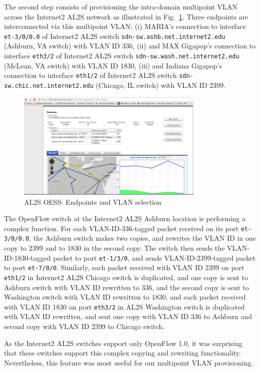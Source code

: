 The second step consists of provisioning the intra-domain multipoint VLAN
across the Internet2 AL2S network as illustrated in Fig.~\ref{fig:oessal2s}.
Three endpoints are interconnected via this multipoint VLAN:
(i) MARIA's connection to interface \texttt{et-3/0/0.0} of Internet2 AL2S switch \texttt{sdn-sw.ashb.net.internet2.edu} (Ashburn, VA switch) with VLAN ID 336,
(ii) and MAX Gigapop's connection to interface \texttt{eth3/2} of Internet2 AL2S switch \texttt{sdn-sw.wash.net.internet2.edu} (McLean, VA switch) with VLAN ID 1830, (iii) and Indiana Gigapop's connection to interface \texttt{eth1/2} of Internet2 AL2S switch \texttt{sdn-sw.chic.net.internet2.edu} (Chicago, IL switch) with VLAN ID 2399.
\begin{figure}[htb!]
\centering
\includegraphics[width=0.8\textwidth]{figures/oess-AL2S.png}
\caption{AL2S OESS: Endpoints and VLAN selection}
\label{fig:oessal2s}
\end{figure}

The OpenFlow switch at the Internet2 AL2S Ashburn location is performing a complex function. 
For each VLAN-ID-336-tagged packet received on its port \texttt{et-3/0/0.0}, the Ashburn
switch makes two copies, and rewrites the VLAN ID in one copy to 2399 and to 1830 in the second copy.
The switch then sends the VLAN-ID-1830-tagged packet to port \texttt{et-1/3/0}, and sends VLAN-ID-2399-tagged packet to port \texttt{et-7/0/0}.
Similarly, each packet received with VLAN ID 2399 on port \texttt{eth1/2} in Internet2 AL2S Chicago switch is duplicated, and one copy is sent to Ashburn switch
with VLAN ID rewritten to 336, and the second copy is sent to Washington switch with VLAN ID rewritten to 1830,
and each packet received with VLAN ID 1830 on port \texttt{eth3/2} in AL2S Washington switch is duplicated with VLAN ID rewritten, and sent one copy with VLAN ID 336 to Ashburn and second copy with VLAN ID 2399 to Chicago switch.


As the Internet2 AL2S switches support only OpenFlow 1.0, it was surprising that these switches
support this complex copying and rewriting functionality. Nevertheless, this feature was
most useful for our multipoint VLAN provisioning.

